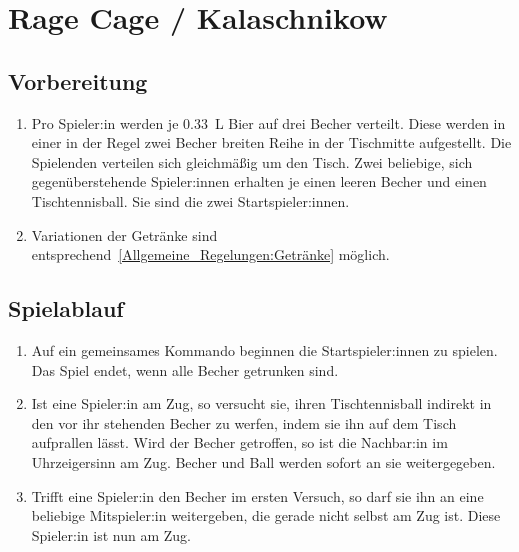 \chapter{Rage Cage / Kalaschnikow}
\section{Vorbereitung}
\begin{enumerate}[label={(\arabic*)}]
    \item
    Pro Spieler:in werden je \SI{0,33}{\liter} Bier auf drei Becher verteilt.
    Diese werden in einer in der Regel zwei Becher breiten Reihe in der Tischmitte aufgestellt.
    Die Spielenden verteilen sich gleichmäßig um den Tisch.
    Zwei beliebige, sich gegenüberstehende Spieler:innen erhalten je einen leeren Becher und einen Tischtennisball.
    Sie sind die zwei Startspieler:innen.

    \item
    Variationen der Getränke sind entsprechend~\ref{Allgemeine_Regelungen:Getränke} möglich.
\end{enumerate}

\section{Spielablauf}
\begin{enumerate}[label={(\arabic*)}]
    \item
    Auf ein gemeinsames Kommando beginnen die Startspieler:innen zu spielen.
    Das Spiel endet, wenn alle Becher getrunken sind.

    \item
    Ist eine Spieler:in am Zug, so versucht sie, ihren Tischtennisball indirekt in den vor ihr stehenden Becher zu werfen, indem sie ihn auf dem Tisch aufprallen lässt.
    Wird der Becher getroffen, so ist die Nachbar:in im Uhrzeigersinn am Zug.
    Becher und Ball werden sofort an sie weitergegeben.

    \item
    Trifft eine Spieler:in den Becher im ersten Versuch, so darf sie ihn an eine beliebige Mitspieler:in weitergeben, die gerade nicht selbst am Zug ist.
    Diese Spieler:in ist nun am Zug.
\end{enumerate}

